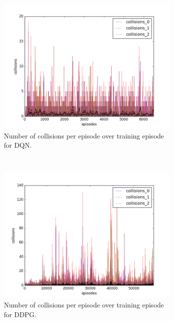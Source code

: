 \begin{figure}[h]
  \begin{subfigure}[h]{\figscale\linewidth}
    \includegraphics[trim=10 10 10 10,clip,width=\linewidth]
    {../results/dqn_1vs2/collisions.png}
    \caption{Number of collisions per episode over training episode for DQN.}
    \label{fig:dqn-1vs2-collisions}
  \end{subfigure}
  ~
  \begin{subfigure}[h]{\figscale\linewidth}
    \includegraphics[trim=10 10 10 10,clip,width=\linewidth]
    {../results/ddpg_1vs2/collisions.png}
    \caption{Number of collisions per episode over training episode for DDPG.}
    \label{fig:ddpg-1vs2-collisions}
  \end{subfigure}
  ~
  \begin{subfigure}[h]{\figscale\linewidth}

\end{subfigure}
\end{figure}
